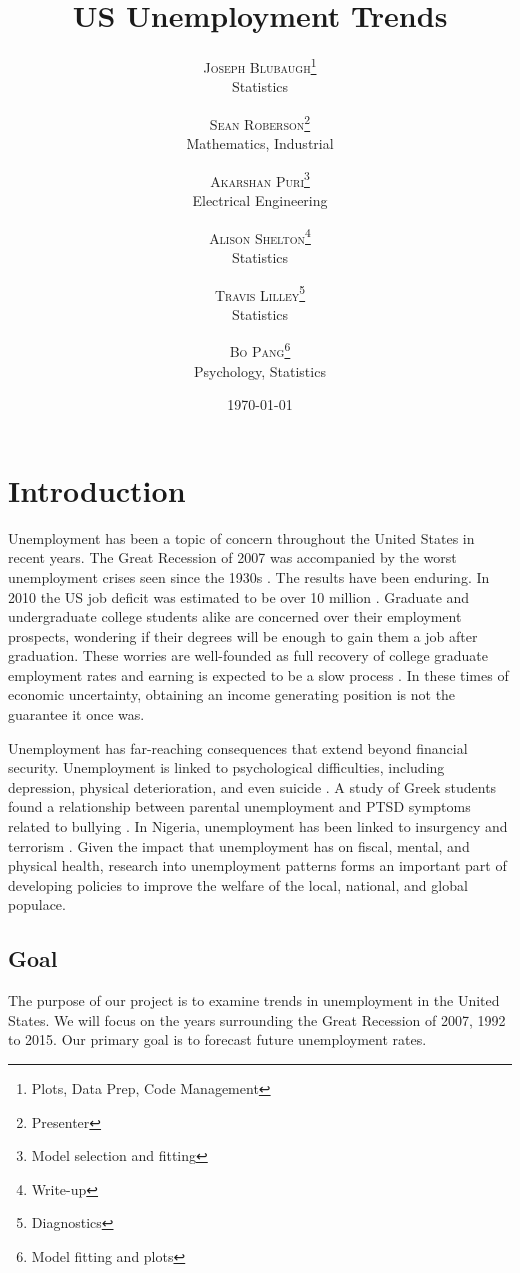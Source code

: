 \documentclass[twoside,twocolumn]{article}
\title{US Unemployment Trends} %
\author{%
\textsc{Joseph Blubaugh}\thanks{Plots, Data Prep, Code Management} \\[1ex] %
\normalsize Statistics\\ %
\and %
\textsc{Sean Roberson}\thanks{Presenter} \\[1ex] %
\normalsize Mathematics, Industrial\\ %
\and
\textsc{Akarshan Puri}\thanks{Model selection and fitting} \\[1ex]
\normalsize Electrical Engineering\\
\and
\textsc{Alison Shelton}\thanks{Write-up} \\[1ex]
\normalsize Statistics\\
\and
\textsc{Travis Lilley}\thanks{Diagnostics} \\[1ex]
\normalsize Statistics\\
\and
\textsc{Bo Pang}\thanks{Model fitting and plots} \\[1 ex]
\normalsize Psychology, Statistics
\vspace*{.5 cm}
}
\date{\today \vspace*{.25 cm}} %
\begin{document}
\maketitle



\section{Introduction}
		Unemployment has been a topic of concern throughout the United States in recent years.  The Great Recession of 2007 was accompanied by the worst unemployment crises seen since the 1930s \citep{wanberg2012individual}.   The results have been enduring. In 2010 the US job deficit was estimated to be over 10 million \citep{katz2010}. Graduate and undergraduate college students alike are concerned over their employment prospects, wondering if their degrees will be enough to gain them a job after graduation.  These worries are well-founded as full recovery of college graduate employment rates and earning is expected to be a slow process \citep{carnevale2015hard}.  In these times of economic uncertainty, obtaining an income generating position is not the guarantee it once was.

Unemployment has far-reaching consequences that extend beyond financial security. Unemployment is linked to psychological difficulties, including depression, physical deterioration, and even suicide  \citep{wanberg2012individual, insecure, suicide}. A study of Greek students found a relationship between parental unemployment and PTSD symptoms related to bullying \citep{kanellopoulos2014epa}. In Nigeria, unemployment has been linked to insurgency and terrorism \citep{terrorism}. Given the impact that unemployment has on fiscal, mental, and physical health, research into unemployment patterns forms an important part of developing policies to improve the welfare of the local, national, and global populace.

\subsection{Goal}
		The purpose of our project is to examine trends in unemployment in the United States. We will focus on the years surrounding the Great Recession of 2007, 1992 to 2015.  Our primary goal is to forecast future unemployment rates.
\end{document}
